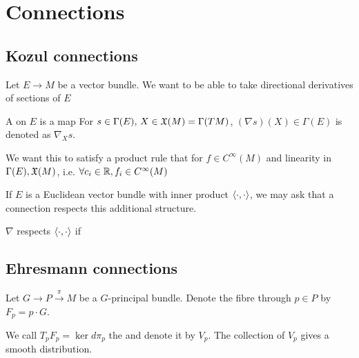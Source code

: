 \documentclass{article}
\begin{document}
\section{Connections}

\subsection{Kozul connections}
Let $ E \to M$ be a vector bundle. We want to be able to take directional derivatives of sections of $E$

\begin{definition}
A  on $E$ is a map 
For $s \in \Gamma(E), \, X \in \mathfrak{X}(M) = \Gamma(TM)$,
$(\nabla s)(X) \in \Gamma(E)$ is denoted as $\nabla_X s$. 
\end{definition}

We want this to satisfy a product rule that for $f \in C^\infty(M)$ 
and linearity in $\Gamma(E), \mathfrak{X}(M)$, i.e. $\forall c_i \in \mathbb{R}, f_i \in C^\infty(M)$

If $E$ is a Euclidean vector bundle with inner product $\left\langle \cdot, \cdot \right\rangle$, we may ask that a connection respects this additional structure. 

\begin{definition}
$\nabla$ respects  $\left\langle \cdot, \cdot \right\rangle$ if 
\end{definition}

\subsection{Ehresmann connections}
Let $G \to P \overset{\pi}{\to} M$ be a $G$-principal bundle. Denote the fibre through $p \in P$ by $F_p = p\cdot G$. 

\begin{definition}
	We call $T_p F_p = \ker d\pi_p$ the  and denote it by $V_p$. The collection of $V_p$ gives a smooth distribution. 
\end{definition}
\end{document}
